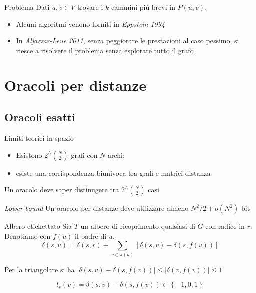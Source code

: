 \documentclass{beamer}
\theoremstyle{plain}
\theoremstyle{definition}
\theoremstyle{remark}
\newcommand{\set}[1]{\left\{#1\right\}}
\newcommand{\pa}[1]{\left(#1\right)}
\newcommand{\bra}[1]{\left[#1\right]}
\newcommand{\abs}[1]{\left|#1\right|}
\begin{document}
\begin{frame}
  \begin{block}{Problema}
    Dati $u,v \in V$ trovare i $k$ cammini pi\`u brevi in $P(u,v)$.
  \end{block}
  \vfill
  
  \begin{itemize}
  \item Alcuni algoritmi venono forniti in \textit{Eppstein 1994}
  \item In \textit{Aljazzar-Leue 2011}, senza peggiorare le
    prestazioni al caso pessimo, si riesce a risolvere il problema
    senza esplorare tutto il grafo
  \end{itemize}
  
\end{frame}


\section{Oracoli per distanze}

\subsection{Oracoli esatti}

\begin{frame}{Limiti teorici in spazio}
  \begin{itemize}
  \item Esistono $2 ^\wedge \binom{ N}{2}$ grafi con $N$ archi;
  \item esiste una corrispondenza biunivoca tra grafi e matrici
    distanza
  \end{itemize}
  \pause \vfill

  Un oracolo deve saper distinugere tra $2 ^\wedge {\binom{ N}{2}}$
  casi \pause
  \begin{block}{\textit{Lower bound}}
    Un oracolo per distanze deve utilizzare almeno $N^2 / 2 + o(N^2)$
    bit
  \end{block}
\end{frame}

\begin{frame}{Albero etichettato}
  Sia $T$ un albero di ricoprimento qualsiasi di $G$ con radice in
  $r$. Denotiamo con $f(u)$ il padre di $u$.
  \vfill
  \[ \delta\pa{ s,u} = \delta\pa{ s,r} + \sum _{v\in \pi (u)} \bra{
    \delta\pa{ s,v} - \delta\pa{ s,f(v) } } \]
  
  Per la triangolare si ha $\abs{\delta\pa{ s,v} - \delta\pa{ s,f(v)}
  } \le \abs{\delta\pa{v,f(v)}} \le 1$ \vfill
  
  \pause
  \[ l_s(v) = \delta\pa{s,v} - \delta\pa{ s, f(v) } \in \set{
    -1,0,1} \]
\end{frame}
\end{document}
